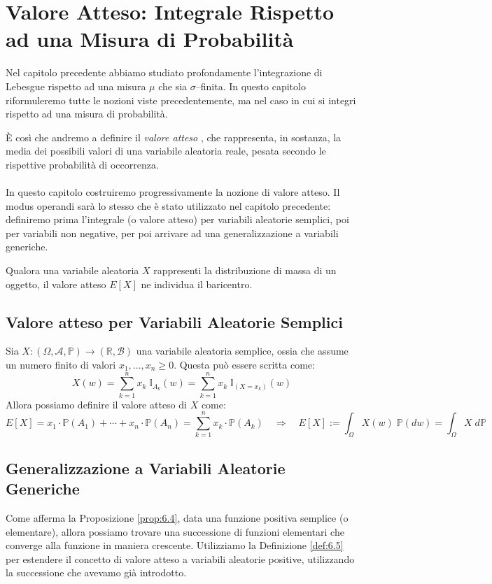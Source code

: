 \chapter{Valore Atteso: Integrale Rispetto ad una Misura di Probabilità}

Nel capitolo precedente abbiamo studiato profondamente l'integrazione di Lebesgue rispetto ad una misura $ \mu $ che sia $\sigma$--finita. In questo capitolo riformuleremo tutte le nozioni viste precedentemente, ma nel caso in cui si integri rispetto ad una misura di probabilità.

\medskip
\noindent È così che andremo a definire il \textit{valore atteso }, che rappresenta, in sostanza, la media dei possibili valori di una variabile aleatoria reale, pesata secondo le rispettive probabilità di occorrenza.\\
\\
In questo capitolo costruiremo progressivamente la nozione di valore atteso. Il 
modus operandi sarà lo stesso che è stato utilizzato nel capitolo precedente: definiremo prima l'integrale (o valore atteso) per variabili aleatorie semplici, poi per variabili non negative, per poi arrivare ad una generalizzazione a variabili generiche.

\begin{esempio}
    Qualora una variabile aleatoria $X$ rappresenti la distribuzione di massa di un oggetto, il valore atteso $E[X]$ ne individua il baricentro.
\end{esempio}
\section{Valore atteso per Variabili Aleatorie Semplici}
\begin{definizione}
    Sia $X:(\Omega, \mathcal{A}, \mathbb{P})\to (\mathbb{R}, \mathcal{B})$ una variabile aleatoria semplice, ossia che assume un numero finito di valori $x_1, ..., x_n\geq0$. Questa può essere scritta come:
    \[X(w) = \sum_{k=1}^n x_k\;\mathbb{I}_{A_k}(w) =  \sum_{k=1}^n x_k\;\mathbb{I}_{(X = x_k)}(w)\]
    Allora possiamo definire il valore atteso di $X$ come:
    \[E[X] = x_1\cdot \mathbb{P}(A_1)+ \cdots +x_n\cdot \mathbb{P}(A_n) = \sum_{k=1}^n x_k\cdot\mathbb{P}(A_k)\quad \Rightarrow\quad E[X] :=\int_\Omega X(w)\;\mathbb{P}(dw) =  \int_\Omega X\;d\mathbb{P}\]
\end{definizione}

\section{Generalizzazione a Variabili Aleatorie Generiche}
\noindent Come afferma la Proposizione \ref{prop:6.4}, data una funzione positiva semplice (o elementare), allora possiamo trovare una successione di funzioni elementari che converge alla funzione in maniera crescente. Utilizziamo la Definizione \ref{def:6.5} per estendere il concetto di valore atteso a variabili aleatorie positive, utilizzando la successione che avevamo già introdotto.

